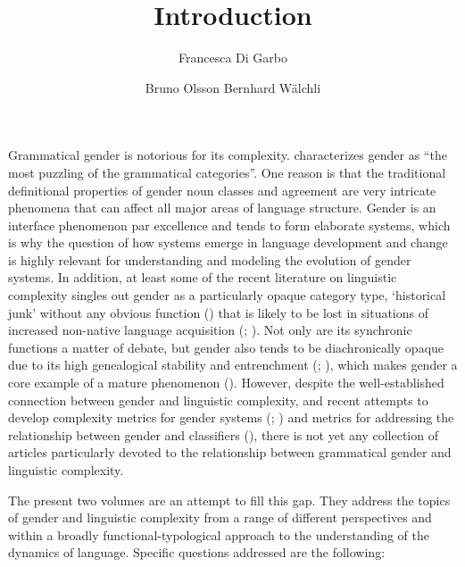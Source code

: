 \documentclass[output=collectionpaper]{langsci/langscibook}
\title{Introduction}
\author{%
Francesca Di Garbo%
\affiliation{Stockholm University}%
\and%
Bruno Olsson%
\affiliation{Australian National University}%
\lastand%
Bernhard Wälchli%
\affiliation{Stockholm University}%
}
\begin{document}
\noindent%
Grammatical gender is notorious for its complexity. \citet[1]{Corbett1991} characterizes gender as ``the most puzzling of the grammatical categories''. One reason is that the traditional definitional properties of gender \textendash{} noun classes and agreement \textendash{} are very intricate phenomena that can affect all major areas of language structure. Gender is an interface phenomenon par excellence and tends to form elaborate systems, which is why the question of how systems emerge in language development and change is highly relevant for understanding and modeling the evolution of gender systems. In addition, at least some of the recent literature on linguistic complexity singles out gender as a particularly opaque category type, `historical junk’ without any obvious function (\citealt[156]{Trudgill2011}) that is likely to be lost in situations of increased non-native language acquisition (\citealt{McWhorter2001,McWhorter2007}; \citealt{Trudgill1999}). Not only are its synchronic functions a matter of debate, but gender also tends to be diachronically opaque due to its high genealogical stability and entrenchment (\citealt[142]{Nichols1992}; \citealt{Nichols2003}), which makes gender a core example of a mature phenomenon (\citealt{Dahl2004}). However, despite the well-established connection between gender and linguistic complexity, and recent attempts to develop complexity metrics for gender systems (\citealt{Audring2014,Audring2017}; \citealt{DiGarbo2016}) and metrics for addressing the relationship between gender and classifiers (\citealt{Passer2016b}), there is not yet any collection of articles particularly devoted to the relationship between grammatical gender and linguistic complexity.

The present two volumes are an attempt to fill this gap. They address the topics of gender and linguistic complexity from a range of different perspectives and within a broadly functional-typological approach to the understanding of the dynamics of language. Specific questions addressed are the following:
\end{document}
